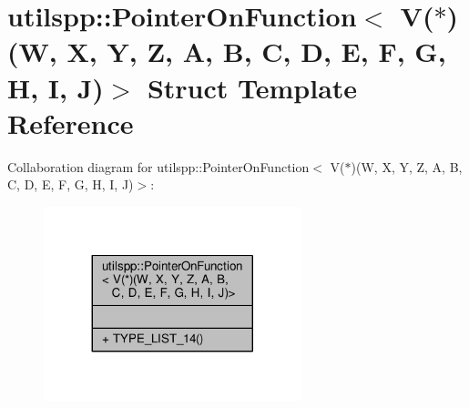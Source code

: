 \hypertarget{structutilspp_1_1PointerOnFunction_3_01V_07_5_08_07W_00_01X_00_01Y_00_01Z_00_01A_00_01B_00_01C_03a6125eb0651b1f0d51b556b7bb56895}{\section{utilspp\-:\-:Pointer\-On\-Function$<$ V($\ast$)(W, X, Y, Z, A, B, C, D, E, F, G, H, I, J)$>$ Struct Template Reference}
\label{structutilspp_1_1PointerOnFunction_3_01V_07_5_08_07W_00_01X_00_01Y_00_01Z_00_01A_00_01B_00_01C_03a6125eb0651b1f0d51b556b7bb56895}
}


Collaboration diagram for utilspp\-:\-:Pointer\-On\-Function$<$ V($\ast$)(W, X, Y, Z, A, B, C, D, E, F, G, H, I, J)$>$\-:\nopagebreak
\begin{figure}[H]
\begin{center}
\leavevmode
\includegraphics[width=212pt]{structutilspp_1_1PointerOnFunction_3_01V_07_5_08_07W_00_01X_00_01Y_00_01Z_00_01A_00_01B_00_01C_03415e6984e1d17e79166e0797b1caf96}
\end{center}
\end{figure}
